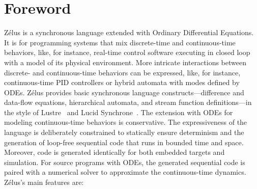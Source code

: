 \documentclass[11pt,titlepage,twoside]{report}
\newcommand{\zelus}{{\sf Z\'elus}}
\newcommand{\lustre}{{\sf Lustre}}
\newcommand{\lucy}{{\sf Lucid Synchrone}}
\begin{document}
\newpage
\cleardoublepage
\tableofcontents
\cleardoublepage

\newcommand{\Left}{\mathit{left}}
\newcommand{\Right}{\mathit{right}}

\chapter*{Foreword\label{foreword}} %

\zelus{} is a synchronous language extended with
Ordinary Differential Equations.
It is for programming systems that mix discrete-time and continuous-time
behaviors, like, for instance, real-time control software executing in 
closed loop with a model of its physical environment.
More intricate interactions between discrete- and continuous-time behaviors 
can be expressed, like, for instance, continuous-time PID controllers or 
hybrid automata with modes defined by ODEs.
\zelus{} provides basic synchronous language constructs---difference and 
data-flow equations, hierarchical automata, and stream function 
definitions---in the style of \lustre~\cite{lustre:ieee91} and
\lucy~\cite{lucy:iste07}.
The extension with ODEs for modeling continuous-time behaviors is 
conservative.
The expressiveness of the language is deliberately constrained to statically 
ensure determinism and the generation of loop-free sequential code that runs 
in bounded time and space. Moreover, code is generated identically for both 
embedded targets and simulation. For source programs with ODEs, the 
generated sequential code is paired with a numerical solver to approximate 
the continuous-time dynamics.
%
\zelus's main features are:
\end{document}
